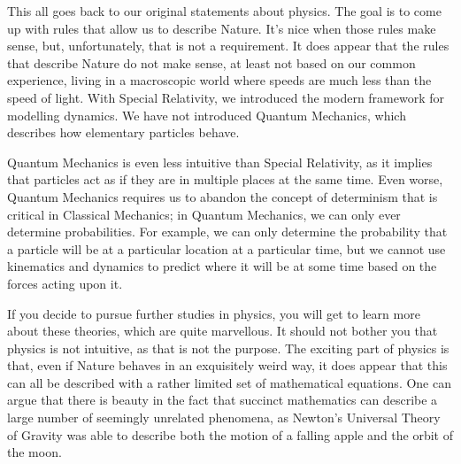 This all goes back to our original statements about physics. The goal is to come up with rules that allow us to describe Nature. It's nice when those rules make sense, but, unfortunately, that is not a requirement. It does appear that the rules that describe Nature do not make sense, at least not based on our common experience, living in a macroscopic world where speeds are much less than the speed of light. With Special Relativity, we introduced the modern framework for modelling dynamics. We have not introduced Quantum Mechanics, which describes how elementary particles behave.

Quantum Mechanics is even less intuitive than Special Relativity, as it implies that particles act as if they are in multiple places at the same time. Even worse, Quantum Mechanics requires us to abandon the concept of determinism that is critical in Classical Mechanics; in Quantum Mechanics, we can only ever determine probabilities. For example, we can only determine the probability that a particle will be at a particular location at a particular time, but we cannot use kinematics and dynamics to predict where it will be at some time based on the forces acting upon it.

If you decide to pursue further studies in physics, you will get to learn more about these theories, which are quite marvellous. It should not bother you that physics is not intuitive, as that is not the purpose. The exciting part of physics is that, even if Nature behaves in an exquisitely weird way, it does appear that this can all be described with a rather limited set of mathematical equations. One can argue that there is beauty in the fact that succinct mathematics can describe a large number of seemingly unrelated phenomena, as Newton's Universal Theory of Gravity was able to describe both the motion of a falling apple and the orbit of the moon.


\newpage
